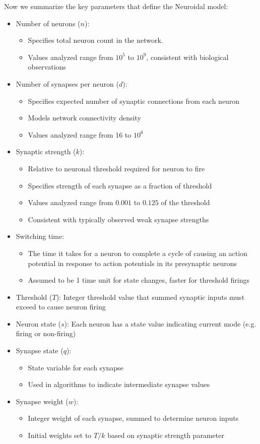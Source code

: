 Now we summarize the key parameters that define the Neuroidal model:
\begin{itemize}
\item Number of neurons ($n$): \begin{itemize} \item Specifies total neuron count in the network.
\item Values analyzed range from $10^5$ to $10^9$, consistent with biological observations
\end{itemize}
\item Number of synapses per neuron ($d$):
\begin{itemize} \item Specifies expected number of synaptic connections from each neuron
\item Models network connectivity density
\item Values analyzed range from 16 to $10^6$
\end{itemize}
\item Synaptic strength ($k$):
\begin{itemize} \item Relative to neuronal threshold required for neuron to fire
\item Specifies strength of each synapse as a fraction of threshold
\item Values analyzed range from $0.001$ to $0.125$ of the threshold
\item Consistent with typically observed weak synapse strengths
\end{itemize}
\item Switching time:
\begin{itemize} \item The time it takes for a neuron to complete a cycle of causing an action potential in response to action potentials in its presynaptic neurons
\item Assumed to be 1 time unit for state changes, faster for threshold firings
\end{itemize}
\item Threshold ($T$):
Integer threshold value that summed synaptic inputs must exceed to cause neuron firing
\item Neuron state ($s$):
Each neuron has a state value indicating current mode (e.g. firing or non-firing)
\item Synapse state ($q$):
\begin{itemize} \item State variable for each synapse
\item Used in algorithms to indicate intermediate synapse values
\end{itemize}
\item Synapse weight ($w$):
\begin{itemize} \item Integer weight of each synapse, summed to determine neuron inputs
\item Initial weights set to $T/k$ based on synaptic strength parameter
\end{itemize}
\end{itemize}

